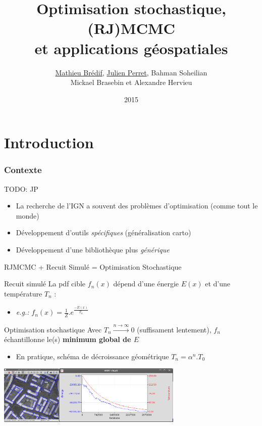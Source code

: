 \documentclass{beamer}
\title{Optimisation stochastique, (RJ)MCMC\\ et applications g\'eospatiales}
\author{\underline{Mathieu Brédif}, \underline{Julien Perret}, Bahman Soheilian\\Mickael Brasebin et Alexandre Hervieu}
\institute{IGN}
\date{2015}
\begin{document}
\frame{\titlepage}
 
 
\section{Introduction}

\begin{frame}
\frametitle{Contexte}
TODO: JP
\begin{itemize}
\item La recherche de l'IGN a souvent des probl\`emes d'optimisation (comme tout le monde)
\item D\'eveloppement d'outils \emph{sp\'ecifiques} (g\'en\'eralisation carto)
\item D\'eveloppement d'une biblioth\`eque plus \emph{g\'en\'erique}
\end{itemize}
\end{frame}


\begin{frame}{RJMCMC + Recuit Simulé = Optimisation Stochastique}

\begin{block}{Recuit simulé}
La pdf cible $f_n(x)$ dépend d'une énergie $E(x)$ et d'une température $T_n$ :
\begin{itemize}
\item \textit{e.g.:} $f_n(x) = \frac{1}{Z}.e^\frac{-E(x)}{T_n}$
\end{itemize}
\end{block}

\begin{block}{Optimisation stochastique }
Avec $T_n\overset{n\rightarrow\infty}{\longrightarrow} 0$ (suffisament lentement), $f_n$ échantillonne le(s) \textbf{minimum global de $E$} 
\begin{itemize}
\item En pratique, schéma de décroissance géométrique $T_n=\alpha^n.T_0$
\end{itemize}
\end{block}

\includegraphics[height=2.8cm]{configuration}\hfill\includegraphics[height=2.8cm]{schedule}
\end{frame}
\end{document}
